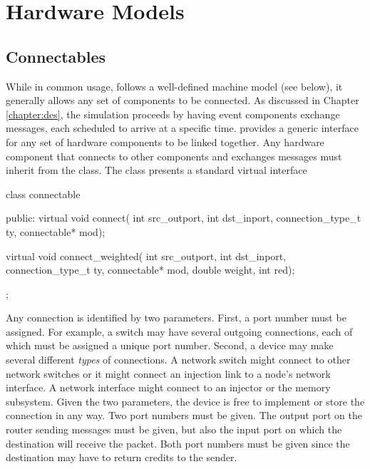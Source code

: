 
\newcommand{\nodecls}{\inlinecode{node}\xspace}
\newcommand{\topcls}{\inlinecode{topology}\xspace}
\newcommand{\switchid}{\inlinecode{switch_id}\xspace}
\newcommand{\nodeid}{\inlinecode{node_id}\xspace}

\chapter{Hardware Models}
\label{chapter:hardware}

\section{Connectables}
\label{sec:connectables}
While in common usage, \sstmacro follows a well-defined machine model (see below),
it generally allows any set of components to be connected. 
As discussed in Chapter \ref{chapter:des}, the simulation proceeds by having event components exchange messages,
each scheduled to arrive at a specific time.
\sstmacro provides a generic interface for any set of hardware components to be linked together.
Any hardware component that connects to other components and exchanges messages must inherit from the  class.
The  class presents a standard virtual interface

\begin{CppCode}
class connectable
{
 public:
  virtual void
  connect(
    int src_outport,
    int dst_inport,
    connection_type_t ty,
    connectable* mod);

  virtual void
  connect_weighted(
    int src_outport,
    int dst_inport, 
    connection_type_t ty,
    connectable* mod,
    double weight, int red);
};
\end{CppCode}

Any connection is identified by two parameters.
First, a port number must be assigned. 
For example, a switch may have several outgoing connections, each of which must be assigned a unique port number.
Second, a device may make several different \emph{types} of connections.
A network switch might connect to other network switches or it might connect an injection link to a node's network interface.
A network interface might connect to an injector or the memory subsystem.
Given the two parameters, the device is free to implement or store the connection in any way.
Two port numbers must be given.  The output port on the router sending messages must be given, but also the input port on which the destination will receive the packet.  
Both port numbers must be given since the destination may have to return credits to the sender.

